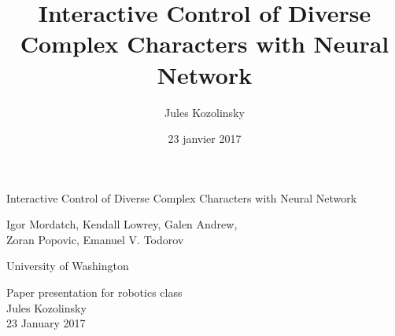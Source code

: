 \documentclass[mathserif]{beamer}
\title[]{Interactive Control of Diverse Complex Characters with Neural Network}
\author[]{Jules Kozolinsky}
\date[]{23 janvier 2017}
\begin{document}

\begin{frame}
  \begin{center}

    \begin{minipage}{.9\textwidth}
      \begin{block}{}
	\begin{center}
	  \Large Interactive Control of Diverse Complex Characters with Neural Network
	\end{center}
      \end{block}
    \end{minipage}

  \vspace*{20pt}
  Igor Mordatch, Kendall Lowrey, Galen Andrew, \\
  Zoran Popovic, Emanuel V. Todorov



 \vspace*{10pt}
  {\small University of Washington}

  \vspace*{2cm}
Paper presentation for robotics class \\
Jules Kozolinsky\\
23 January 2017

  \end{center}
\end{frame}











\end{document}
